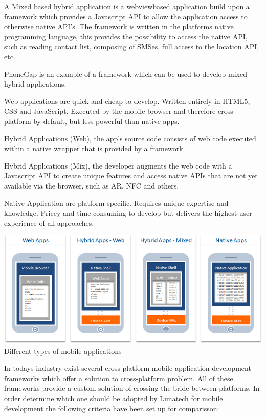 A Mixed based hybrid application is a webviewbased application build upon a framework which provides a Javascript API to allow the application access to otherwise native API's. The framework is written in the platforms native programming language, this provides the possibility to access the native API, such as reading contact list, composing of SMSes, full access to the location API, etc.

PhoneGap is an example of a framework which can be used to develop mixed hybrid applications.

Web applications are quick and cheap to develop. Written entirely in HTML5, CSS and JavaScript. Executed by the mobile
browser and therefore cross - platform by default, but less powerful than native apps.
 
Hybrid Applications (Web), the app's source code consists of web code executed within a native wrapper that is provided by a framework.
 
Hybrid Applications (Mix), the developer augments the web code with a Javascript API to create unique features and
access native APIs that are not yet available via the browser, such as AR, NFC and others.
 
Native Application are platform-specific. Requires unique expertise and knowledge. Pricey and time consuming to develop but
 delivers the highest user experience of all approaches.

\begin{centering}
\includegraphics[scale=0.5]{images/apptypesdefined.png}\\{Different types of mobile applications\cite{IBM-Worklight2012}}\\
\end{centering}

In todays industry exist several cross-platform mobile application development frameworks which offer a solution to cross-platform problem. All of these frameworks provide a custom solution of crossing the bride between platforms. In order determine which one should be adopted by Lunatech for mobile development the following criteria have been set up for comparisson:

